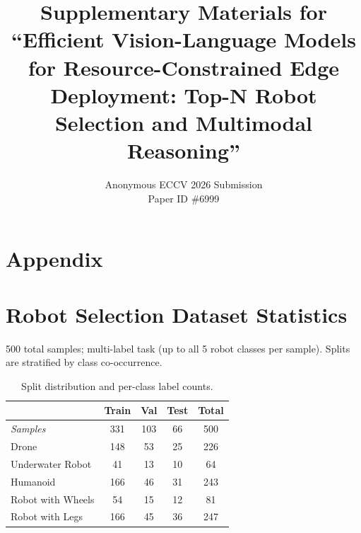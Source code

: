 \documentclass[runningheads]{llncs}
\begin{document}
\raggedbottom
\sloppy
\title{Supplementary Materials for ``Efficient Vision-Language Models for Resource-Constrained Edge Deployment: Top-N Robot Selection and Multimodal Reasoning''}
\author{Anonymous ECCV 2026 Submission\\Paper ID \#6999}
\institute{}
\maketitle

\section*{Appendix}

\section{Robot Selection Dataset Statistics}
\label{sec:supp-dataset}

500 total samples; multi-label task (up to all 5 robot classes per sample). Splits are stratified by class co-occurrence.

\begin{table}[ht]
\centering
\caption{Split distribution and per-class label counts.}
\label{tab:dataset-full}
\setlength{\tabcolsep}{5pt}
\begin{tabular}{lcccc}
\toprule
 & \textbf{Train} & \textbf{Val} & \textbf{Test} & \textbf{Total} \\
\midrule
\textit{Samples}      & 331 & 103 & 66  & 500 \\
\midrule
Drone                 & 148 &  53 &  25 & 226 \\
Underwater Robot      &  41 &  13 &  10 &  64 \\
Humanoid              & 166 &  46 &  31 & 243 \\
Robot with Wheels     &  54 &  15 &  12 &  81 \\
Robot with Legs       & 166 &  45 &  36 & 247 \\
\bottomrule
\end{tabular}
\end{table}
\end{document}
